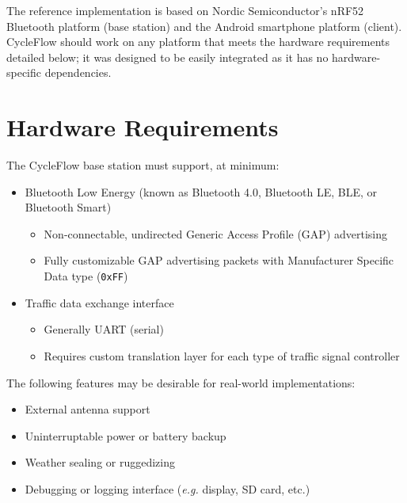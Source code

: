 \documentclass[12pt, oneside]{article}
\begin{document}
The reference implementation is based on Nordic Semiconductor's nRF52 Bluetooth platform (base station) and the Android smartphone platform (client). CycleFlow should work on any platform that meets the hardware requirements detailed below; it was designed to be easily integrated as it has no hardware-specific dependencies.


\section{Hardware Requirements}
The CycleFlow base station must support, at minimum:
\begin{itemize}
\item Bluetooth Low Energy (known as Bluetooth 4.0, Bluetooth LE, BLE, or Bluetooth Smart)
\begin{itemize}
\item Non-connectable, undirected Generic Access Profile (GAP) advertising
\item Fully customizable GAP advertising packets with Manufacturer Specific Data type (\texttt{0xFF})
\end{itemize}

\item Traffic data exchange interface
\begin{itemize}
\item Generally UART (serial)
\item Requires custom translation layer for each type of traffic signal controller
\end{itemize}
\end{itemize}

The following features may be desirable for real-world implementations:
\begin{itemize}
\item External antenna support
\item Uninterruptable power or battery backup
\item Weather sealing or ruggedizing
\item Debugging or logging interface (\textit{e.g.} display, SD card, etc.)
\end{itemize}
\end{document}
